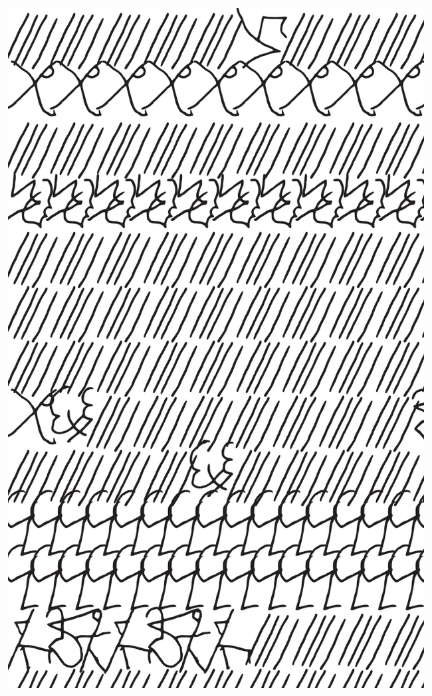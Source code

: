 \makeatletter\@openrightfalse
\movetooddpage
\begin{absolutelynopagebreak}
\begin{vplace}
\begin{figure}[H]
\begin{adjustwidth}{-0.99cm}{}
  \centering
  \vspace*{-1.77cm}
  \includegraphics[width=110mm]{./imgs/img7.pdf}  
  \hfill
\end{adjustwidth}

\thispagestyle{empty}

\end{figure}
\end{vplace}

\end{absolutelynopagebreak}

